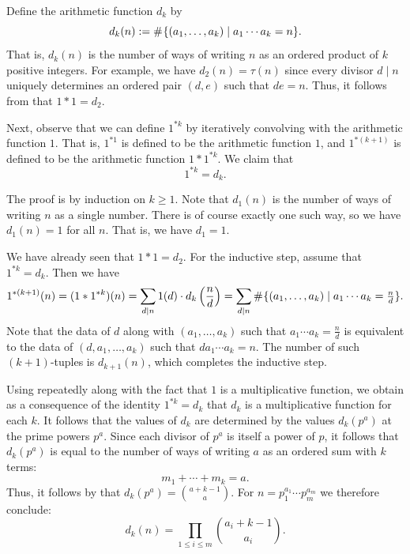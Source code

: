 \begin{example}\label{example:convolution-powers-1}
  Define the arithmetic function $d_k$ by
  \begin{equation*}
    d_k(n) := \mathord{\#}\mkern1mu \{(a_1,\ldots,a_k) \mid a_1\cdots a_k=n\}.
  \end{equation*}
  That is, $d_k(n)$ is the number of ways of writing $n$ as an ordered product of $k$ positive integers. For example, we have $d_2(n)=\tau(n)$ since every divisor $d\mid n$ uniquely determines an ordered pair $(d,e)$ such that $de=n$. Thus, it follows from  that $1\ast 1=d_2$.

  Next, observe that we can define $1^{\ast k}$ by iteratively convolving with the arithmetic function $1$. That is, $1^{\ast 1}$ is defined to be the arithmetic function $1$, and $1^{\ast(k+1)}$ is defined to be the arithmetic function $1\ast 1^{\ast k}$. We claim that
  \begin{equation*}
    1^{\ast k}=d_k.
  \end{equation*}

  The proof is by induction on $k\geq 1$. Note that $d_1(n)$ is the number of ways of writing $n$ as a single number. There is of course exactly one such way, so we have $d_1(n)=1$ for all $n$. That is, we have $d_1=1$.

  We have already seen that $1\ast 1=d_2$. For the inductive step, assume that $1^{\ast k}=d_k$. Then we have
  \begin{equation*}
    1^{\ast(k+1)}(n) = (1\ast 1^{\ast k})(n) =
    \sum_{d\mid n}1(d)\cdot d_k\left(\frac{n}{d}\right)=\sum_{d\mid n}\mathord{\#}\mkern1mu \{(a_1,\ldots,a_k)\mid a_1\cdots a_k=\tfrac{n}{d}\}.
  \end{equation*}
  Note that the data of $d$ along with $(a_1,\ldots,a_k)$ such that $a_1\cdots a_k=\frac{n}{d}$ is equivalent to the data of $(d,a_1,\ldots,a_k)$ such that $da_1\cdots a_k=n$. The number of such $(k+1)$-tuples is $d_{k+1}(n)$, which completes the inductive step.

  Using  repeatedly along with the fact that $1$ is a multiplicative function, we obtain as a consequence of the identity $1^{\ast k}=d_k$ that $d_k$ is a multiplicative function for each $k$. It follows that the values of $d_k$ are determined by the values $d_k(p^a)$ at the prime powers $p^a$. Since each divisor of $p^a$ is itself a power of $p$, it follows that $d_k(p^a)$ is equal to the number of ways of writing $a$ as an ordered sum with $k$ terms:
  \begin{equation*}
    m_1+\cdots+m_k=a.
  \end{equation*}
  Thus, it follows by  that $d_k(p^a)=\binom{a+k-1}{a}$. For $n=p_1^{a_1}\cdots p_m^{a_m}$ we therefore conclude:
  \begin{equation*}
    d_k(n) = \prod_{1\leq i\leq m}\binom{a_i+k-1}{a_i}.
  \end{equation*}
\end{example}


